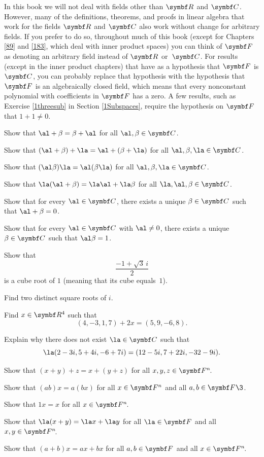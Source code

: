 In this book we will not deal with fields other than $\R{}$ and $\C{}$. However, many of the definitions, theorems, and proofs in linear  algebra that work for the fields $\R{}$ and $\C{}$ also work without change for arbitrary fields. If you prefer to do so, throughout much of this book (except for Chapters \ref{89} and \ref{183}, which deal with inner product spaces) you can think of $\F{}$ as denoting an arbitrary field instead of $\R{}$ or~$\C{}$. For results (except in the inner product chapters) that have as a hypothesis that $\F{}$ is $\C{}$, you can probably replace that hypothesis with the hypothesis that $\F{}$ is an algebraically closed field, which means that every nonconstant polynomial with coefficients in $\F{}$ has a zero. A few results, such as Exercise \ref{1threesub} in Section \ref{1Subspaces}, require the hypothesis on $\F{}$ that $1 + 1 \ne 0$.

\begin{exercises}

\exercise
Show that $\al + \beta = \beta + \al$ for all $\al, \beta \in \C{}$.


\exercise
Show that $(\al + \beta) +  \la = \al + (\beta + \la)$ for all $\al, \beta, \la \in \C{}$.


\exercise
Show that $(\al \beta)\la = \al(\beta \la)$ for all $\al, \beta, \la \in \C{}$.


\exercise
Show that $\la(\al + \beta) = \la \al + \la \beta$ for all $\la, \al, \beta \in
\C{}$.


\exercise
Show that for every $\al \in \C{}$, there exists a unique $\beta \in \C{}$ such that
$\al + \beta = 0$.


\exercise
Show that for every $\al \in \C{}$ with $\al \ne 0$, there exists a unique $\beta \in \C{}$ such that $\al \beta = 1$.


\exercise
Show that
\[
\frac{-1 + \sqrt{3} \, i}{2}
\]
is a cube root of $1$ (meaning that its cube  equals~$1$).


\exercise
Find two distinct square roots of $i$.


\exercise
Find $x \in \R{4}$ such that
\[
(4, -3, 1, 7) + 2x = (5, 9, -6, 8).
\]
\exercisedisplayend


\exercise
Explain why there does not exist $\la \in \C{}$ such that
\[
\la (2 - 3i, 5 + 4i, -6 + 7i) = (12 - 5i, 7 + 22i, -32 - 9i).
\]
\exercisedisplayend


\exercise
Show that $(x + y) + z  = x + (y + z) $ for all $x, y, z \in \FF{n}$.


\exercise
Show that $(ab)x = a(bx)$ for all $x \in \F{n}$ and all $a, b \in \F{}\3$.


\exercise
Show that $1x = x$ for all $x \in \FF{n}$.


\exercise
Show that $\la(x + y) = \la x + \la y$ for all $\la \in \F{}$ and all $x, y \in \FF{n}$.


\exercise
Show that $(a + b)x = ax + bx$ for all $a, b \in \F{}$ and all $x \in \FF{n}$.


\end{exercises}

